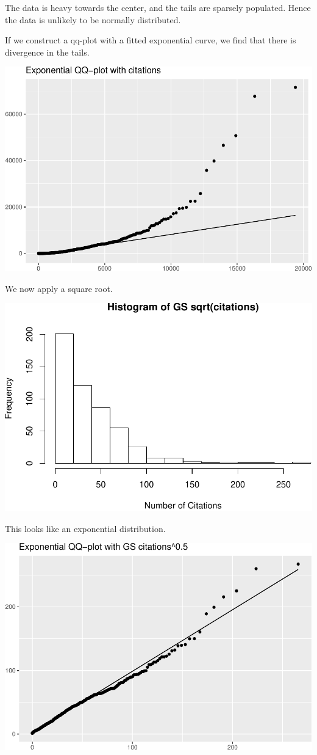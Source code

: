 \documentclass[]{article}
\begin{document}
The data is heavy towards the center, and the tails are sparsely
populated. Hence the data is unlikely to be normally distributed.

If we construct a qq-plot with a fitted exponential curve, we find that
there is divergence in the tails.

\includegraphics{final_files/figure-latex/unnamed-chunk-7-1.pdf}

We now apply a square root.

\includegraphics{final_files/figure-latex/unnamed-chunk-8-1.pdf}

This looks like an exponential distribution.

\includegraphics{final_files/figure-latex/unnamed-chunk-9-1.pdf}
\end{document}
